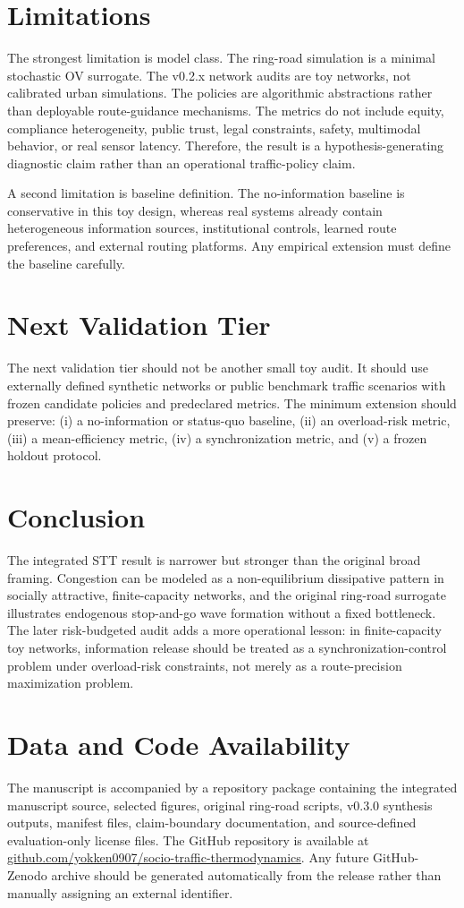 \documentclass[11pt]{article}
\begin{document}
\section{Limitations}
The strongest limitation is model class. The ring-road simulation is a minimal stochastic OV surrogate. The v0.2.x network audits are toy networks, not calibrated urban simulations. The policies are algorithmic abstractions rather than deployable route-guidance mechanisms. The metrics do not include equity, compliance heterogeneity, public trust, legal constraints, safety, multimodal behavior, or real sensor latency. Therefore, the result is a hypothesis-generating diagnostic claim rather than an operational traffic-policy claim.

A second limitation is baseline definition. The no-information baseline is conservative in this toy design, whereas real systems already contain heterogeneous information sources, institutional controls, learned route preferences, and external routing platforms. Any empirical extension must define the baseline carefully.

\section{Next Validation Tier}
The next validation tier should not be another small toy audit. It should use externally defined synthetic networks or public benchmark traffic scenarios with frozen candidate policies and predeclared metrics. The minimum extension should preserve: (i) a no-information or status-quo baseline, (ii) an overload-risk metric, (iii) a mean-efficiency metric, (iv) a synchronization metric, and (v) a frozen holdout protocol.

\section{Conclusion}
The integrated STT result is narrower but stronger than the original broad framing. Congestion can be modeled as a non-equilibrium dissipative pattern in socially attractive, finite-capacity networks, and the original ring-road surrogate illustrates endogenous stop-and-go wave formation without a fixed bottleneck. The later risk-budgeted audit adds a more operational lesson: in finite-capacity toy networks, information release should be treated as a synchronization-control problem under overload-risk constraints, not merely as a route-precision maximization problem.

\section*{Data and Code Availability}
The manuscript is accompanied by a repository package containing the integrated manuscript source, selected figures, original ring-road scripts, v0.3.0 synthesis outputs, manifest files, claim-boundary documentation, and source-defined evaluation-only license files. The GitHub repository is available at \href{https://github.com/yokken0907/socio-traffic-thermodynamics}{github.com/yokken0907/socio-traffic-thermodynamics}. Any future GitHub-Zenodo archive should be generated automatically from the release rather than manually assigning an external identifier.
\end{document}
